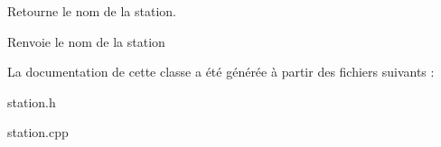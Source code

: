Retourne le nom de la station. 

\begin{DoxyReturn}{Renvoie}
le nom de la station 
\end{DoxyReturn}


La documentation de cette classe a été générée à partir des fichiers suivants :\begin{DoxyCompactItemize}
\item 
station.h\item 
station.cpp\end{DoxyCompactItemize}
